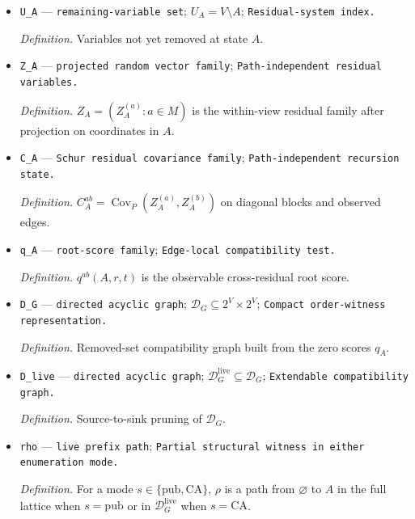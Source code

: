 \documentclass{article}
\begin{document}
\begin{itemize}
  \par\smallskip\noindent\emph{Definition.} \texttt{Set of original variable labels already assigned coefficient rows.}
  \item \texttt{U\_\allowbreak{}A} --- \texttt{remaining-\allowbreak{}variable set}; \(U_A=V\setminus A\); \texttt{Residual-\allowbreak{}system index.}
  \par\smallskip\noindent\emph{Definition.} Variables not yet removed at state \(A\).
  \item \texttt{Z\_\allowbreak{}A} --- \texttt{projected random vector family}; \texttt{Path-\allowbreak{}independent residual variables.}
  \par\smallskip\noindent\emph{Definition.} \(Z_A=(Z_A^{(a)}:a\in M)\) is the within-view residual family after projection on coordinates in \(A\).
  \item \texttt{C\_\allowbreak{}A} --- \texttt{Schur residual covariance family}; \texttt{Path-\allowbreak{}independent recursion state.}
  \par\smallskip\noindent\emph{Definition.} \(C_A^{ab}=\operatorname{Cov}_P(Z_A^{(a)},Z_A^{(b)})\) on diagonal blocks and observed edges.
  \item \texttt{q\_\allowbreak{}A} --- \texttt{root-\allowbreak{}score family}; \texttt{Edge-\allowbreak{}local compatibility test.}
  \par\smallskip\noindent\emph{Definition.} \(q^{ab}(A,r,t)\) is the observable cross-residual root score.
  \item \texttt{D\_\allowbreak{}G} --- \texttt{directed acyclic graph}; \(\mathcal D_G\subseteq 2^V\times2^V\); \texttt{Compact order-\allowbreak{}witness representation.}
  \par\smallskip\noindent\emph{Definition.} Removed-set compatibility graph built from the zero scores \(q_A\).
  \item \texttt{D\_\allowbreak{}live} --- \texttt{directed acyclic graph}; \(\mathcal D_G^{\mathrm{live}}\subseteq\mathcal D_G\); \texttt{Extendable compatibility graph.}
  \par\smallskip\noindent\emph{Definition.} Source-to-sink pruning of \(\mathcal D_G\).
  \item \texttt{rho} --- \texttt{live prefix path}; \texttt{Partial structural witness in either enumeration mode.}
  \par\smallskip\noindent\emph{Definition.} For a mode \(s\in\{\mathrm{pub},\mathrm{CA}\}\), \(\rho\) is a path from \(\varnothing\) to \(A\) in the full lattice when \(s=\mathrm{pub}\) or in \(\mathcal D_G^{\mathrm{live}}\) when \(s=\mathrm{CA}\).

\end{itemize}
\end{document}
